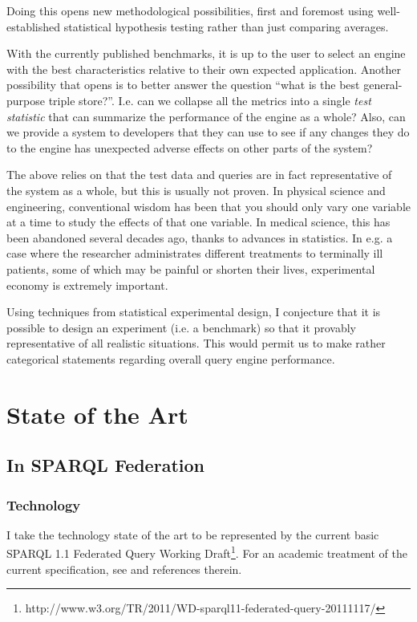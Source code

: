 \documentclass{llncs}
\begin{document}
Doing this opens new methodological possibilities, first and foremost
using well-established statistical hypothesis testing rather than just
comparing averages. 

With the currently published benchmarks, it is up to the user to
select an engine with the best characteristics relative to their own
expected application. Another possibility that opens is to better
answer the question ``what is the best general-purpose triple
store?''. I.e. can we collapse all the metrics into a single
\emph{test statistic} that can summarize the performance of the engine
as a whole? Also, can we provide a system to developers that they can
use to see if any changes they do to the engine has unexpected adverse
effects on other parts of the system?

The above relies on that the test data and queries are in fact
representative of the system as a whole, but this is usually not proven.
In physical science and engineering, conventional wisdom
has been that you should only vary one variable at a time to study the
effects of that one variable. In medical science, this has been
abandoned several decades ago, thanks to advances in statistics. In
e.g. a case where the researcher administrates different treatments to
terminally ill patients, some of which may be painful or shorten their
lives, experimental economy is extremely important.

Using techniques from statistical experimental design, I conjecture
that it is possible to design an experiment (i.e. a benchmark) so
that it provably representative of all realistic situations. This
would permit us to make rather categorical statements regarding
overall query engine performance.


\section{State of the Art}

\subsection{In SPARQL Federation}

\subsubsection{Technology}

I take the technology state of the art to be represented by the
current basic SPARQL 1.1 Federated Query Working
Draft\footnote{http://www.w3.org/TR/2011/WD-sparql11-federated-query-20111117/}. For
an academic treatment of the current specification, see
\cite{springerlink:10.1007/978-3-642-21064-8_1} and references therein.
\end{document}
